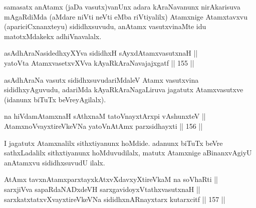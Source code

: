 \begin{artha}
samasatx anAtamx (jaDa vasutx)vanUnx adara kAraNavanunx nirAkarisuva
mAgaRdiMda (aMdare niVti neVti eMba riVtiyalilx) Atamxnige Atamxtavxvu
(apariciCxnanxteyu) sididhxsuvudu, anAtamx vasutxvinaMte idu
matotxMdakekx adhiVnavalalx.
\end{artha}


\begin{shl}
\footnotemark[1]asAdhAraNasidedhxyXYva sididhxH sAyxdAtamxvasutxnaH || \\
yatoV\s ta AtamxvasetxvXVva kAyaRkAraNavajajxgatf \hfill || 155 ||  
\end{shl}

\begin{artha}
asAdhAraNa vasutx sididhxsuvudariMdaleV Atamx vasutxvina
sididhxyAguvudu, adariMda kAyaRkAraNagaLiruva jagatutx Atamxvasutxve
(idanunx biTuTx beVreyAgilalx).
\end{artha}

\begin{shl}
\footnotemark[2]na hiVdamAtamxnaH sAthxnaM tatoV\s nayxtArxpi vA\s shunxteV || \\
AtamxnoV\s vayxtireVkeVNa yatoV\s nAtAmx parxsidhayxti \hfill || 156 ||  
\end{shl}

\begin{artha}
I jagatutx Atamxnalilx sithxtiyanunx hoMdide. adanunx biTuTx beVre
sathxLadalilx sithxtiyanunx hoMduvudilalx, matutx Atamxnige
aBinanxvAgiyU anAtamxvu sididhxsuvudU ilalx.
\end{artha}


\begin{shl}
AtAmx tavxnAtamxparxtayxkAtxvXdavxyXtireVkaM na soV\s haRti || \\
sarxjiVva sapaRdaNADxdeVH sarxgavidoyxVtathxvasutxnaH || \\
sarxkatxtatxvXvayxtireVkeVNa sididhxnARnayxtarx kutarxcitf \hfill || 157 ||  
\end{shl}

